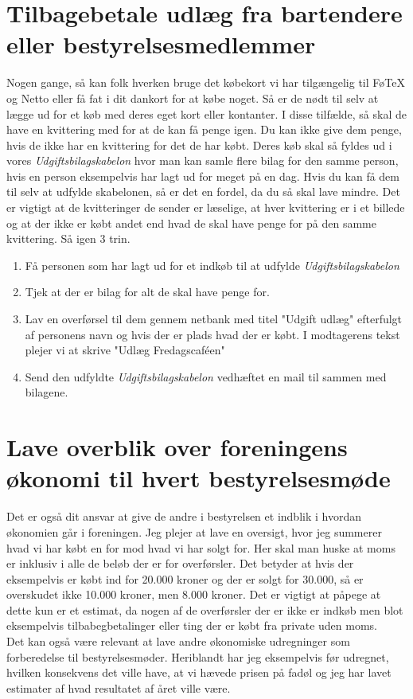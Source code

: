 \section{Tilbagebetale udlæg fra bartendere eller bestyrelsesmedlemmer}
Nogen gange, så kan folk hverken bruge det købekort vi har tilgængelig til FøTeX og Netto eller få fat i dit dankort for at købe noget. Så er de nødt til selv at lægge ud for et køb med deres eget kort eller kontanter. I disse tilfælde, så skal de have en kvittering med for at de kan få penge igen. Du kan ikke give dem penge, hvis de ikke har en kvittering for det de har købt. Deres køb skal så fyldes ud i vores \textit{Udgiftsbilagskabelon} hvor man kan samle flere bilag for den samme person, hvis en person eksempelvis har lagt ud for meget på en dag. Hvis du kan få dem til selv at udfylde skabelonen, så er det en fordel, da du så skal lave mindre. Det er vigtigt at de kvitteringer de sender er læselige, at hver kvittering er i et billede og at der ikke er købt andet end hvad de skal have penge for på den samme kvittering. Så igen 3 trin.
\begin{enumerate}
    \item Få personen som har lagt ud for et indkøb til at udfylde \textit{Udgiftsbilagskabelon}
    \item Tjek at der er bilag for alt de skal have penge for.
    \item Lav en overførsel til dem gennem netbank med titel "Udgift udlæg" efterfulgt af personens navn og hvis der er plads hvad der er købt. I modtagerens tekst plejer vi at skrive "Udlæg Fredagscaféen"
    \item Send den udfyldte \textit{Udgiftsbilagskabelon} vedhæftet en mail til  sammen med bilagene.
\end{enumerate}

\section{Lave overblik over foreningens økonomi til hvert bestyrelsesmøde}
Det er også dit ansvar at give de andre i bestyrelsen et indblik i hvordan økonomien går i foreningen. Jeg plejer at lave en oversigt, hvor jeg summerer hvad vi har købt en for mod hvad vi har solgt for. Her skal man huske at moms er inklusiv i alle de beløb der er for overførsler. Det betyder at hvis der eksempelvis er købt ind for 20.000 kroner og der er solgt for 30.000, så er overskudet ikke 10.000 kroner, men 8.000 kroner. Det er vigtigt at påpege at dette kun er et estimat, da nogen af de overførsler der er ikke er indkøb men blot eksempelvis tilbabegbetalinger eller ting der er købt fra private uden moms.\\
Det kan også være relevant at lave andre økonomiske udregninger som forberedelse til bestyrelsesmøder. Heriblandt har jeg eksempelvis før udregnet, hvilken konsekvens det ville have, at vi hævede prisen på fadøl og jeg har lavet estimater af hvad resultatet af året ville være.

